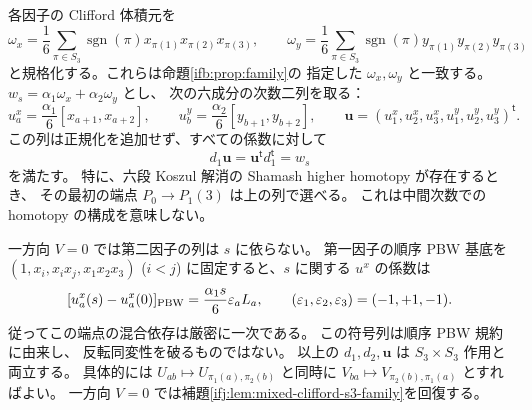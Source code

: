 \begin{proposition}
各因子の Clifford 体積元を
\begin{equation}\label{ifj:eq:mixed-koszul-alternating-volume}
 \omega_x=\frac16\sum_{\pi\in S_3}\operatorname{sgn}(\pi)
     x_{\pi(1)}x_{\pi(2)}x_{\pi(3)},\qquad
 \omega_y=\frac16\sum_{\pi\in S_3}\operatorname{sgn}(\pi)
     y_{\pi(1)}y_{\pi(2)}y_{\pi(3)}
\end{equation}
と規格化する。これらは命題\ref{ifb:prop:family}の
指定した $\omega_x,\omega_y$ と一致する。
$w_s=\alpha_1\omega_x+\alpha_2\omega_y$ とし、
次の六成分の次数二列を取る：
\begin{equation}\label{ifj:eq:mixed-koszul-curvature-primitive}
 u^x_a=\frac{\alpha_1}{6}[x_{a+1},x_{a+2}],\qquad
 u^y_b=\frac{\alpha_2}{6}[y_{b+1},y_{b+2}],\qquad
 \mathbf u=(u^x_1,u^x_2,u^x_3,u^y_1,u^y_2,u^y_3)^{\mathsf t}.
\end{equation}
この列は正規化を追加せず、すべての係数に対して
\begin{equation}\label{ifj:eq:mixed-koszul-curvature-endpoints}
      d_1\mathbf u=\mathbf u^{\mathsf t}d_1^{\mathsf t}=w_s
\end{equation}
を満たす。
特に、六段 Koszul 解消の Shamash higher homotopy が存在するとき、
その最初の端点 $P_0\to P_1(3)$ は上の列で選べる。
これは中間次数での homotopy の構成を意味しない。

一方向 $V=0$ では第二因子の列は $s$ に依らない。
第一因子の順序 PBW 基底を $(1,x_i,x_ix_j,x_1x_2x_3)$ ($i<j$)
に固定すると、$s$ に関する $u^x$ の係数は
\begin{equation}\label{ifj:eq:mixed-koszul-ordered-jet}
 [u^x_a(s)-u^x_a(0)]_{\rm PBW}
  =\frac{\alpha_1s}{6}\varepsilon_a L_a,
              \qquad(\varepsilon_1,\varepsilon_2,\varepsilon_3)=(-1,+1,-1).
\end{equation}
従ってこの端点の混合依存は厳密に一次である。
この符号列は順序 PBW 規約に由来し、
反転同変性を破るものではない。
以上の $d_1,d_2,\mathbf u$ は $S_3\times S_3$ 作用と両立する。
具体的には $U_{ab}\mapsto U_{\pi_1(a),\pi_2(b)}$ と同時に
$V_{ba}\mapsto V_{\pi_2(b),\pi_1(a)}$ とすればよい。
一方向 $V=0$ では補題\ref{ifj:lem:mixed-clifford-s3-family}を回復する。
\end{proposition}

